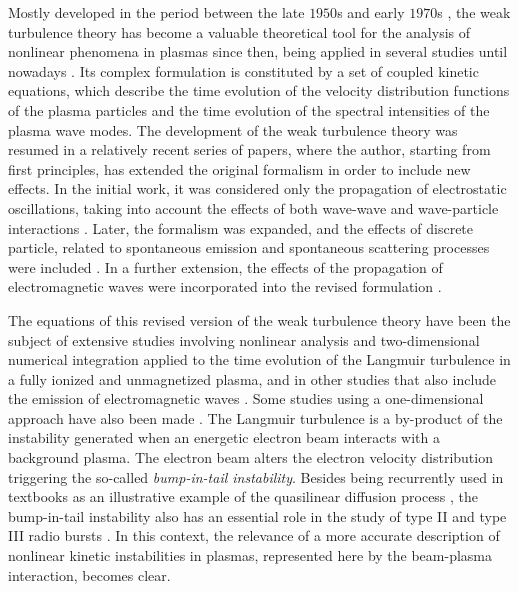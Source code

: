 \documentclass[12pt,a4paper,ruledheader]{report}
\begin{document}
Mostly developed in the period between the late $1950$s and early
$1970$s \cite{Kadomtsev1965,Tsytovich1967,saggal,tsynlep,david,
  tsyitotp,akhi2,tsytotp,mel}, the weak turbulence theory has
become a valuable theoretical tool for the analysis of nonlinear
phenomena in plasmas since then, being applied in several studies
until nowadays \cite{Grognard1982,McClements87b,Hanssen1991,
  Edney2001,Kontar2001,Kontar2002,THD13}. Its complex formulation
is constituted by a set of coupled kinetic equations, which describe
the time evolution of the velocity distribution functions of the
plasma particles and the time evolution of the spectral intensities of
the plasma wave modes. The development of the weak turbulence theory
was resumed in a relatively recent series of papers, where the author,
starting from first principles, has extended the original formalism in
order to include new effects. In the initial work, it was considered
only the propagation of electrostatic oscillations, taking into account
the effects of both wave-wave and wave-particle interactions \cite{Yoon00}.
Later, the formalism was expanded, and the effects of discrete particle,
related to spontaneous emission and spontaneous scattering processes
were included \cite{Yoon05a}. In a further extension, the effects of
the propagation of electromagnetic waves were incorporated into the
revised formulation \cite{Yoon06,Yoon2012b}.

The equations of this revised version of the weak turbulence theory
have been the subject of extensive studies involving nonlinear analysis
and two-dimensional numerical integration applied to the time evolution
of the Langmuir turbulence \cite{ZGPY08,Ziebell2012,YZGLW12,
  ZYGP14a,ZYGP14b} in a fully ionized and unmagnetized plasma, and in
other studies that also include the emission of electromagnetic waves
\cite{ZYSGP14c,ZYPGP15,ZPYGP16}. Some studies using a one-dimensional
approach have also been made \cite{ZiebellGY01,GaelzerZY02,GZVYR08}.
The Langmuir turbulence is a by-product  of the instability generated
when an energetic electron beam interacts with a background plasma. The
electron beam alters the electron velocity distribution triggering the
so-called \emph{bump-in-tail instability}. Besides being recurrently used
in textbooks as an illustrative example of the quasilinear diffusion process
\cite{akhi2,chen,gurnett2017}, the bump-in-tail instability also has an
essential role in the study of type II and type III radio bursts
\cite{Emslie1984,Hannah2009,ZVST11,Hannah2011,KK12,Reid2014,BNKR14}. In
this context, the relevance of a more accurate description of nonlinear
kinetic instabilities in plasmas, represented here by the beam-plasma
interaction, becomes clear.
\end{document}
